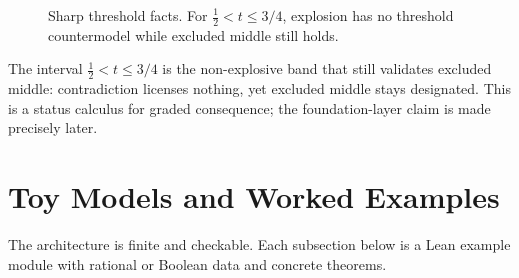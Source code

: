 \documentclass[11pt,a4paper]{article}
\newcommand{\half}{\tfrac12}
\begin{document}
\begin{figure}[h]
\centering
{}
\caption{Sharp threshold facts.  For $\half<t\le 3/4$, explosion has
no threshold countermodel while excluded middle still holds.}
\label{fig:thresholds}
\end{figure}

The interval $\half<t\le3/4$ is the non-explosive band that still
validates excluded middle: contradiction licenses nothing, yet excluded
middle stays designated.  This is a status calculus for graded
consequence; the foundation-layer claim is made precisely later.

\section{Toy Models and Worked Examples}
\label{sec:toy-models}

The architecture is finite and checkable.  Each subsection below is a
Lean example module with rational or Boolean data and concrete theorems.
\end{document}
